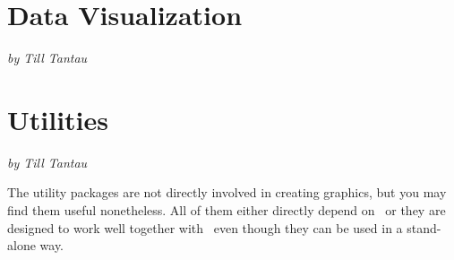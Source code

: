 

































\part{Data Visualization}
\label{part-dv}

{\Large \emph{by Till Tantau}}

\bigskip
\noindent












\part{Utilities}
\label{part-utilities}

{\Large \emph{by Till Tantau}}


\bigskip
\noindent
The utility packages are not directly involved in creating graphics,
but you may find them useful nonetheless. All of them either directly
depend on \pgfname\ or they are designed to work well together with
\pgfname\ even though they can be used in a stand-alone way.

